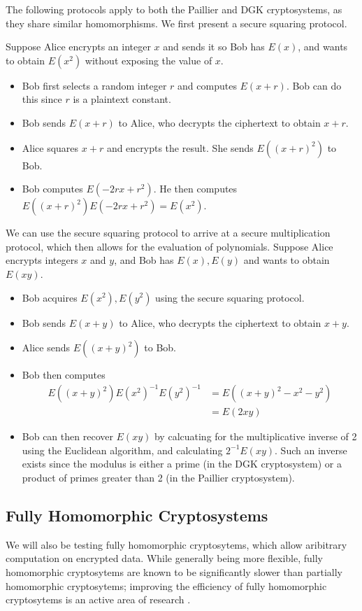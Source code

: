 The following protocols apply to both the Paillier and DGK cryptosystems, as they share similar homomorphisms. We first present a secure squaring protocol.

Suppose Alice encrypts an integer $x$ and sends it so Bob has $E(x)$, and wants to obtain $E(x^2)$ without exposing the value of $x$.
\begin{itemize}
	\item Bob first selects a random integer $r$ and computes $E(x+r)$. Bob can do this since $r$ is a plaintext constant.
	\item Bob sends $E(x+r)$ to Alice, who decrypts the ciphertext to obtain $x+r$.
	\item Alice squares $x+r$ and encrypts the result. She sends $E((x+r)^2)$ to Bob.
	\item Bob computes $E(-2rx + r^2)$. He then computes $E((x+r)^2)E(-2rx + r^2) = E(x^2)$.
\end{itemize}

We can use the secure squaring protocol to arrive at a secure multiplication protocol, which then allows for the evaluation of polynomials.
Suppose Alice encrypts integers $x$ and $y$, and Bob has $E(x), E(y)$ and wants to obtain $E(xy)$.
\begin{itemize}
	\item Bob acquires $E(x^2), E(y^2)$ using the secure squaring protocol.
	\item Bob sends $E(x+y)$ to Alice, who decrypts the ciphertext to obtain $x+y$.
	\item Alice sends $E((x+y)^2)$ to Bob.
	\item Bob then computes
	\begin{align*}
		E((x+y)^2)E(x^2)^{-1}E(y^2)^{-1} &= E((x+y)^2 - x^2 - y^2)\\
		&= E(2xy)
	\end{align*}
	\item Bob can then recover $E(xy)$ by calcuating for the multiplicative inverse of 2 using the Euclidean algorithm, and calculating $2^{-1}E(xy)$. Such an inverse exists since the modulus is either a prime (in the DGK cryptosystem) or a product of primes greater than 2 (in the Paillier cryptosystem).
\end{itemize}

\subsection{Fully Homomorphic Cryptosystems}
We will also be testing fully homomorphic cryptosytems, which allow aribitrary computation on encrypted data.
While generally being more flexible, fully homomorphic cryptosytems are known to be significantly slower than partially homomorphic cryptosytems; improving the efficiency of fully homomorphic cryptosytems is an active area of research \cite{sen_homomorphic_2013}.

